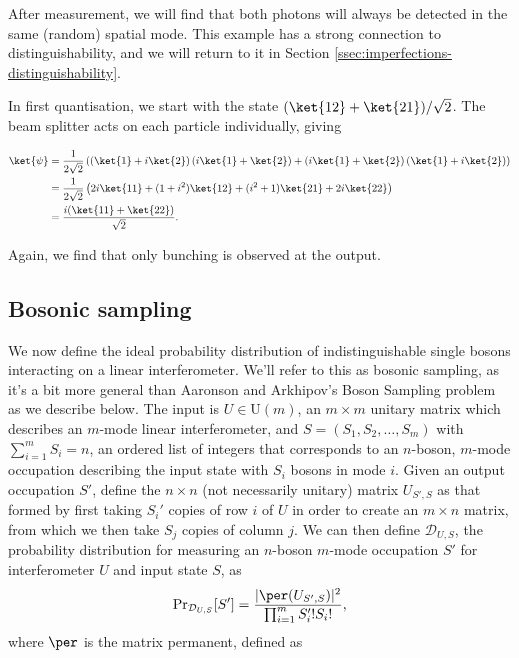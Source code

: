 After measurement, we will find that both photons will always be detected in the same (random) spatial mode. This example has a strong connection to distinguishability, and we will return to it in Section \ref{ssec:imperfections-distinguishability}.

In first quantisation, we start with the state $(\ket{12} + \ket{21})/\sqrt{2}$. The beam splitter acts on each particle individually, giving

\begin{align}
\ket{\psi} &= \frac{1}{2\sqrt{2}}\left(\left(\ket{1} + i\ket{2}\right)\left(i\ket{1} + \ket{2}\right) + \left(i\ket{1} + \ket{2}\right)\left(\ket{1} + i\ket{2}\right)\right)\\
&= \frac{1}{2\sqrt{2}}\left(2i\ket{11} + (1+i^2)\ket{12} + (i^2+1)\ket{21} + 2i\ket{22}\right)\\
&= \frac{i(\ket{11}+\ket{22})}{\sqrt{2}}.
\end{align}

Again, we find that only bunching is observed at the output.

\subsection{Bosonic sampling}
\label{ssec:bosonic-sampling}

We now define the ideal probability distribution of indistinguishable single bosons interacting on a linear interferometer.
We'll refer to this as bosonic sampling, as it's a bit more general than Aaronson and Arkhipov's Boson Sampling problem as we describe below.
The input is $U \in \mathrm{U}(m)$, an $m\times m$ unitary matrix which describes an $m$-mode linear interferometer, and $S = (S_1,S_2,\dots,S_m)$ with $\sum_{i=1}^m S_i =n$, an ordered list of integers that corresponds to an $n$-boson, $m$-mode occupation describing the input state with $S_i$ bosons in mode $i$. 
Given an output occupation $S'$, define the $n \times n$ (not necessarily unitary) matrix $U_{S',S}$ as that formed by first taking $S_i'$ copies of row $i$ of $U$ in order to create an $m\times n$ matrix, from which we then take $S_j$ copies of column $j$. 
We can then define $\mathcal{D}_{U,S}$, the probability distribution for measuring an $n$-boson $m$-mode occupation $S'$ for interferometer $U$ and input state $S$, as
\begin{equation}\label{eqn:bs-distribution}
\textrm{Pr}_{\mathcal{D}_{U,S}}[S'] = \frac{|\per(U_{S',S})|^2}{\prod_{i=1}^m S_i'! S_i!} ,
\end{equation}
where $\per$ is the matrix permanent, defined as

